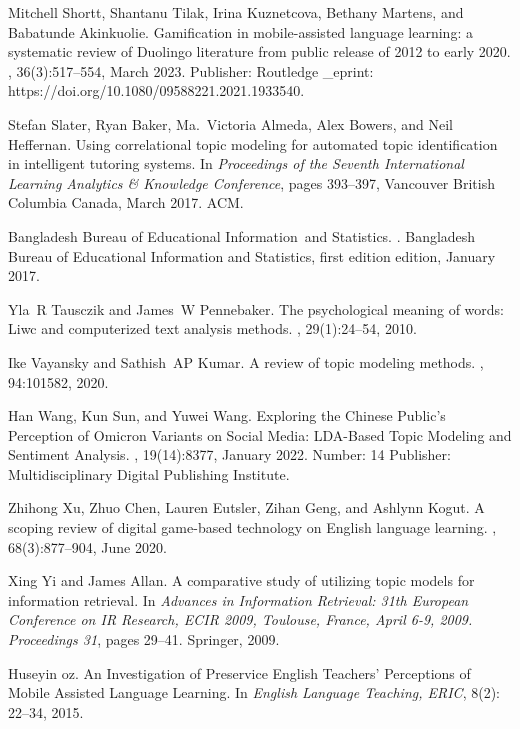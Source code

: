 \begin{thebibliography}{10}
Mitchell Shortt, Shantanu Tilak, Irina Kuznetcova, Bethany Martens, and
  Babatunde Akinkuolie.
\newblock Gamification in mobile-assisted language learning: a systematic
  review of {Duolingo} literature from public release of 2012 to early 2020.
, 36(3):517--554, March
  2023.
\newblock Publisher: Routledge \_eprint:
  https://doi.org/10.1080/09588221.2021.1933540.

Stefan Slater, Ryan Baker, Ma.~Victoria Almeda, Alex Bowers, and Neil
  Heffernan.
\newblock Using correlational topic modeling for automated topic identification
  in intelligent tutoring systems.
\newblock In {\em Proceedings of the {Seventh} {International} {Learning}
  {Analytics} \& {Knowledge} {Conference}}, pages 393--397, Vancouver British
  Columbia Canada, March 2017. ACM.

Bangladesh Bureau of Educational Information~and Statistics.
.
\newblock Bangladesh Bureau of Educational Information and Statistics, first
  edition edition, January 2017.

Yla~R Tausczik and James~W Pennebaker.
\newblock The psychological meaning of words: Liwc and computerized text
  analysis methods.
, 29(1):24--54, 2010.

Ike Vayansky and Sathish~AP Kumar.
\newblock A review of topic modeling methods.
, 94:101582, 2020.

Han Wang, Kun Sun, and Yuwei Wang.
\newblock Exploring the {Chinese} {Public}’s {Perception} of {Omicron}
  {Variants} on {Social} {Media}: {LDA}-{Based} {Topic} {Modeling} and
  {Sentiment} {Analysis}.
, 19(14):8377, January 2022.
\newblock Number: 14 Publisher: Multidisciplinary Digital Publishing Institute.

Zhihong Xu, Zhuo Chen, Lauren Eutsler, Zihan Geng, and Ashlynn Kogut.
\newblock A scoping review of digital game-based technology on {English}
  language learning.
,
  68(3):877--904, June 2020.

Xing Yi and James Allan.
\newblock A comparative study of utilizing topic models for information
  retrieval.
\newblock In {\em Advances in Information Retrieval: 31th European Conference
  on IR Research, ECIR 2009, Toulouse, France, April 6-9, 2009. Proceedings
  31}, pages 29--41. Springer, 2009.

Huseyin oz.
\newblock An Investigation of Preservice English Teachers' Perceptions of Mobile Assisted Language Learning.
\newblock In {\em English Language Teaching, ERIC}, 8(2): 22--34, 2015.

\end{thebibliography}
